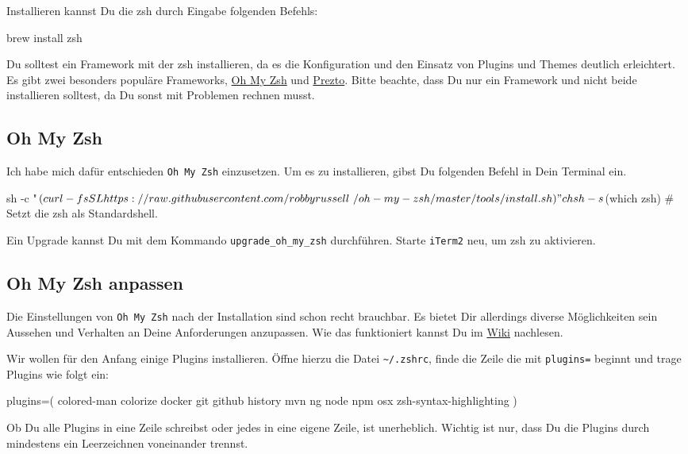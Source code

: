 \documentclass[]{article}
\newcommand{\code}[1]{\texttt{#1}}
\begin{document}
Installieren kannst Du die zsh durch Eingabe folgenden Befehls:
\begin{bashcode}
brew install zsh
\end{bashcode}

Du solltest ein Framework mit der zsh installieren, da es die Konfiguration und den Einsatz von Plugins und Themes deutlich erleichtert. Es gibt zwei besonders populäre Frameworks, \href{https://github.com/robbyrussell/oh-my-zsh}{Oh My Zsh} und \href{https://github.com/sorin-ionescu/prezto}{Prezto}.
Bitte beachte, dass Du nur ein Framework und nicht beide installieren solltest, da Du sonst mit Problemen rechnen musst.

\subsection{Oh My Zsh}
Ich habe mich dafür entschieden \code{Oh My Zsh} einzusetzen. Um es zu installieren, gibst Du folgenden Befehl in Dein Terminal ein.
\begin{bashcode}
sh -c "$(curl -fsSL https://raw.githubusercontent.com/robbyrussell\
/oh-my-zsh/master/tools/install.sh)"
chsh -s $(which zsh) # Setzt die zsh als Standardshell.
\end{bashcode}

Ein Upgrade kannst Du mit dem Kommando \code{upgrade\_oh\_my\_zsh} durchführen. Starte \code{iTerm2} neu, um zsh zu aktivieren.

\subsection{Oh My Zsh anpassen}
Die Einstellungen von \code{Oh My Zsh} nach der Installation sind schon recht brauchbar. Es bietet Dir allerdings diverse Möglichkeiten sein Aussehen und Verhalten an Deine Anforderungen anzupassen. Wie das funktioniert kannst Du im \href{https://github.com/robbyrussell/oh-my-zsh/wiki}{Wiki} nachlesen.

Wir wollen für den Anfang einige Plugins installieren. Öffne hierzu die Datei \code{\~\//.zshrc}, finde die Zeile die mit \code{plugins=} beginnt und trage Plugins wie folgt ein:
\begin{bashcode}
plugins=(
  colored-man 
  colorize  
  docker 
  git 
  github 
  history 
  mvn 
  ng 
  node 
  npm 
  osx 
  zsh-syntax-highlighting
)
\end{bashcode}
Ob Du alle Plugins in eine Zeile schreibst oder jedes in eine eigene Zeile, ist unerheblich. Wichtig ist nur, dass Du die Plugins durch mindestens ein Leerzeichnen voneinander trennst.
\end{document}
